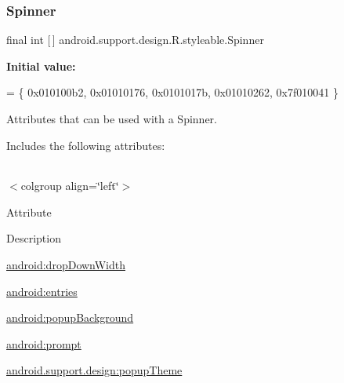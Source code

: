\subsubsection{\texorpdfstring{Spinner}{Spinner}}
{\footnotesize\ttfamily final int \mbox{[}$\,$\mbox{]} android.\+support.\+design.\+R.\+styleable.\+Spinner\hspace{0.3cm}{\ttfamily [static]}}

{\bfseries Initial value\+:}
\begin{DoxyCode}
= \{
            0x010100b2, 0x01010176, 0x0101017b, 0x01010262,
            0x7f010041
        \}
\end{DoxyCode}
Attributes that can be used with a Spinner. 

Includes the following attributes\+:

\tabulinesep=1mm
\begin{longtabu} spread 0pt [c]{*{0}{|X[-1]}|}
\hline
\end{longtabu}
$<$colgroup align=\char`\"{}left\char`\"{}$>$ 

Attribute

Description 

{\ttfamily \hyperlink{classandroid_1_1support_1_1design_1_1R_1_1styleable_ae8ecbc06818c2f20c1ce916dea5258d0}{android\+:drop\+Down\+Width}}

{\ttfamily \hyperlink{classandroid_1_1support_1_1design_1_1R_1_1styleable_a2d05682e0b3d919b968bca48f733aab2}{android\+:entries}}

{\ttfamily \hyperlink{classandroid_1_1support_1_1design_1_1R_1_1styleable_ae1f9a39bc965c26a19d360729ee54483}{android\+:popup\+Background}}

{\ttfamily \hyperlink{classandroid_1_1support_1_1design_1_1R_1_1styleable_a601b330e85f621a2fd8f83ea6aa87d52}{android\+:prompt}}

{\ttfamily \hyperlink{classandroid_1_1support_1_1design_1_1R_1_1styleable_a59a6d161b7f6cda7fafb201a44bebca6}{android.\+support.\+design\+:popup\+Theme}}

